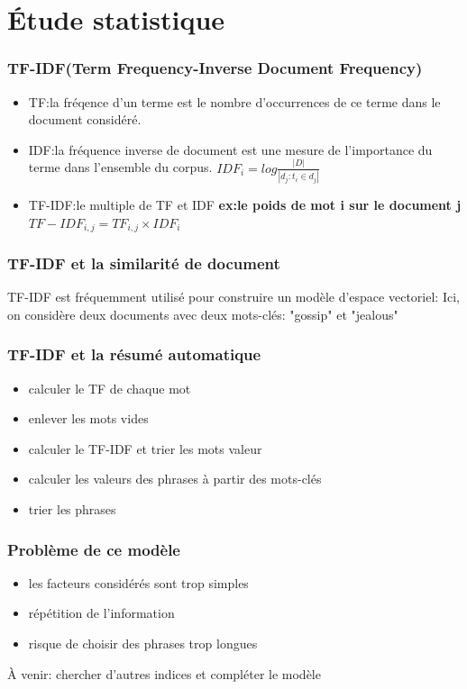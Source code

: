 \documentclass{beamer}
\begin{document}
\section{Étude statistique}
\begin{frame}
\frametitle{TF-IDF(Term Frequency-Inverse Document Frequency)}
\begin{itemize}
  \item TF:la fréqence d'un terme est le nombre d'occurrences de ce terme dans le document considéré.
  \item IDF:la fréquence inverse de document est une mesure de l'importance du terme dans l'ensemble du corpus.
$IDF_{i}=log \frac{|D|}{|d_{j}:t_{i}\in d_{j}|}$
  \item TF-IDF:le multiple de TF et IDF
  \textbf{ex:le poids de mot i sur le document j}
   $TF-IDF_{i,j} = TF_{i,j} \times IDF_{i}$
\end{itemize}
\end{frame}

\begin{frame}
\frametitle{TF-IDF et la similarité de document}
TF-IDF est fréquemment utilisé pour construire un modèle d'espace vectoriel:
Ici, on considère deux documents avec deux mots-clés: "gossip" et "jealous"
\end{frame}

\begin{frame}
\frametitle{TF-IDF et la résumé automatique}
\begin{itemize}
  \item calculer le TF de chaque mot
  \item enlever les mots vides
  \item calculer le TF-IDF et trier les mots valeur
  \item calculer les valeurs des phrases à partir des mots-clés
  \item trier les phrases
\end{itemize}
\end{frame}

\begin{frame}
\frametitle{Problème de ce modèle}
\begin{itemize}
  \item les facteurs considérés sont trop simples
  \item répétition de l'information
  \item risque de choisir des phrases trop longues
\end{itemize}
À venir: chercher d'autres indices et compléter le modèle
\end{frame}
\end{document}
